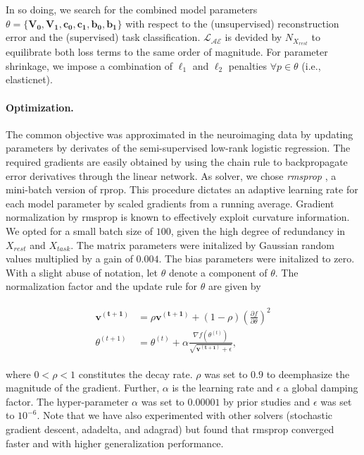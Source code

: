 \documentclass{article} %
\begin{document}
In so doing, we search for the combined model parameters
$\theta=\{\mathbf{V_0,V_1,c_0, c_1, b_0, b_1}\}$
with respect to the (unsupervised) reconstruction error and the
(supervised) task classification.
${\mathcal{L_{AE}}}$ is devided by ${N_{X_{rest}}}$ to equilibrate both
loss terms to the same order of magnitude.
For parameter shrinkage, we
impose a combination of $\ell_1$ and $\ell_2$ penalties
$\forall p \in \theta$ (i.e., elasticnet).

\paragraph{Optimization.}
The common objective was approximated 
in the neuroimaging data
by updating parameters by derivates 
of the 
semi-supervised low-rank logistic regression.
The required gradients are easily obtained by using the chain rule to
backpropagate error derivatives through the linear network.
As solver, we chose \textit{rmsprop} \cite{rmsprop},
a mini-batch version of rprop.
This procedure dictates an adaptive learning rate
for each model parameter by
scaled gradients from a running average.
Gradient normalization by rmsprop
is known to effectively exploit curvature information.
We opted for a small batch size of $100$, given the high degree of
redundancy in $X_{rest}$ and $X_{task}$.
The matrix parameters were initalized by Gaussian random values multiplied
by a gain of $0.004$. The bias parameters were initalized to zero.
With a slight abuse of notation, let $\theta$ denote a component of $\theta$.
The normalization factor and the update rule for $\theta$
are given by

\begin{eqnarray}
  \begin{split}
    \mathbf{v^{(t+1)}} &= \rho \mathbf{v^{(t+1)}} + (1 - \rho)\left(\frac{\partial f}{\partial \theta}\right)^2
\\
\theta^{(t+1)} &= \theta^{(t)} + \alpha \frac{\nabla f(\theta^{(t)})}{\sqrt{\mathbf{v^{(t+1)}} + \epsilon}},
  \end{split}
\end{eqnarray}

where $0 < \rho < 1$ constitutes the decay rate. $\rho$ was set to
$0.9$ to deemphasize the magnitude of the gradient.
Further, $\alpha$ is the learning rate and $\epsilon$ a global damping factor.
The hyper-parameter $\alpha$ was set to $0.00001$ by prior studies and $\epsilon$ was set to $10^{-6}$.
%
Note that we have also experimented with other solvers
(stochastic gradient descent, adadelta, and adagrad) but found that
rmsprop converged faster and with higher generalization performance.
\end{document}
